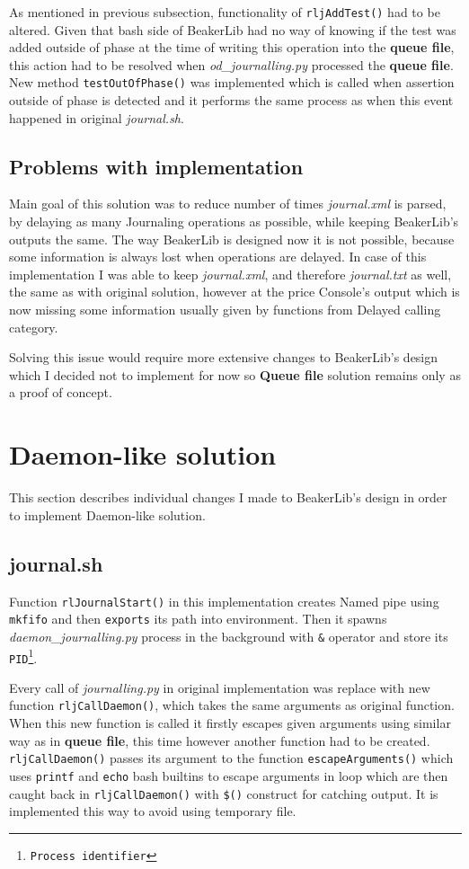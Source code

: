 As mentioned in previous subsection, functionality of  \texttt{rljAddTest()} had to be altered. Given that bash side of BeakerLib had no way of knowing if the test was added outside of phase at the time of writing this operation into the \textbf{queue file}, this action had to be resolved when \textit{od\_journalling.py} processed the \textbf{queue file}. 
New method \texttt{testOutOfPhase()} was implemented which is called when assertion outside of phase is detected and it performs the same process as when this event happened in original \textit{journal.sh}.

\subsection{Problems with implementation}
Main goal of this solution was to reduce number of times \textit{journal.xml} is parsed, by delaying as many Journaling operations as possible, while keeping BeakerLib's outputs the same. The way BeakerLib is designed now it is not possible, because some information is always lost when operations are delayed. In case of this implementation I was able to keep \textit{journal.xml}, and therefore \textit{journal.txt}  as well, the same as with original solution, however at the price Console's output which is now missing some information usually given by functions from Delayed calling category.

Solving this issue would require more extensive changes to BeakerLib's design which I decided not to implement for now so \textbf{Queue file} solution remains only as a proof of concept.

\section{Daemon-like solution}
This section describes individual changes I made to BeakerLib's design in order to implement Daemon-like solution.

\subsection{journal.sh}
Function \texttt{rlJournalStart()} in this implementation creates Named pipe using \texttt{mkfifo} and then \texttt{exports} its path into environment.
Then it spawns \textit{daemon\_journalling.py} process in the background with \texttt{\&} operator and store its \texttt{PID\footnote{Process identifier}}.

Every call of \textit{journalling.py} in original implementation was replace with new function \texttt{rljCallDaemon()}, which takes the same arguments as original function. When this new function is called it firstly escapes given arguments using similar way as in \textbf{queue file}, this time however another function had to be created.  \texttt{rljCallDaemon()} passes its argument to the function \texttt{escapeArguments()} which uses \texttt{printf} and \texttt{echo} bash builtins to escape arguments in loop which are then caught back in \texttt{rljCallDaemon()} with \texttt{\$()} construct\cite{command_substitution} for catching output. It is implemented this way to avoid using temporary file.

